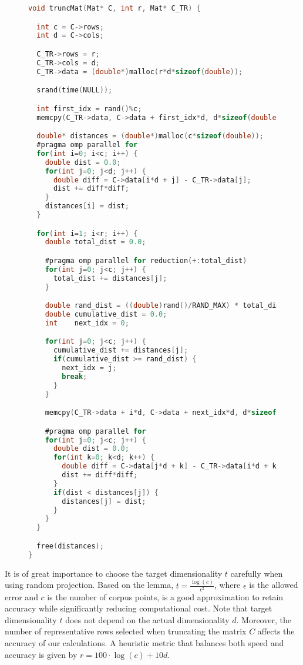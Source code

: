 \documentclass{article}
\begin{document}
\begin{figure}[H]
\begin{lstlisting}[language=C, caption={Matrix Truncation}]
void truncMat(Mat* C, int r, Mat* C_TR) {

  int c = C->rows;
  int d = C->cols;

  C_TR->rows = r;
  C_TR->cols = d;
  C_TR->data = (double*)malloc(r*d*sizeof(double));

  srand(time(NULL));

  int first_idx = rand()%c;
  memcpy(C_TR->data, C->data + first_idx*d, d*sizeof(double));

  double* distances = (double*)malloc(c*sizeof(double));
  #pragma omp parallel for
  for(int i=0; i<c; i++) {
    double dist = 0.0;
    for(int j=0; j<d; j++) {
      double diff = C->data[i*d + j] - C_TR->data[j];
      dist += diff*diff;
    }
    distances[i] = dist;
  }

  for(int i=1; i<r; i++) {
    double total_dist = 0.0;

    #pragma omp parallel for reduction(+:total_dist)
    for(int j=0; j<c; j++) {
      total_dist += distances[j];
    }

    double rand_dist = ((double)rand()/RAND_MAX) * total_dist;
    double cumulative_dist = 0.0;
    int    next_idx = 0;

    for(int j=0; j<c; j++) {
      cumulative_dist += distances[j];
      if(cumulative_dist >= rand_dist) {
        next_idx = j;
        break;
      }
    }

    memcpy(C_TR->data + i*d, C->data + next_idx*d, d*sizeof(double));

    #pragma omp parallel for
    for(int j=0; j<c; j++) {
      double dist = 0.0;
      for(int k=0; k<d; k++) {
        double diff = C->data[j*d + k] - C_TR->data[i*d + k];
        dist += diff*diff;
      }
      if(dist < distances[j]) {
        distances[j] = dist;
      }
    }
  }

  free(distances);
}
\end{lstlisting}
\end{figure}

\phantom{This is a placeholder}

It is of great importance to choose the target dimensionality \( t \) carefully when using random projection. Based on the lemma, \( t = \frac{ \log(c)}{\epsilon^2} \), where \( \epsilon \) is the allowed error and \( c \) is the number of corpus points, is a good approximation to retain accuracy while significantly reducing computational cost. Note that target dimensionality \( t \) does not depend on the actual dimensionality \(d\). Moreover, the number of representative rows selected when truncating the matrix \( C \) affects the accuracy of our calculations. A heuristic metric that balances both speed and accuracy is given by \( r = 100 \cdot \log(c) + 10d \).
\end{document}
